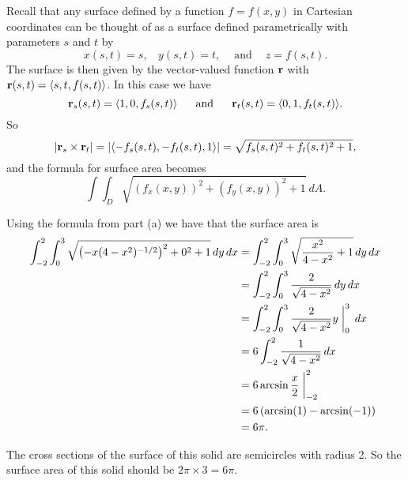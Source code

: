 \begin{activitySolution}
    \ba 
\item Recall that any surface defined by a function $f = f(x,y)$ in Cartesian coordinates can be thought of as a surface defined parametrically with parameters $s$ and $t$ by
\[x(s,t)=s, \ \ \ \ y(s,t) = t, \ \ \ \ \text{ and } \ \ \ \ z = f(s,t).\]
The surface is then given by the vector-valued function $\mathbf{r}$ with $\mathbf{r}(s,t) = \langle s, t, f(s,t) \rangle$. In this case we have
\[\mathbf{r}_s(s,t) = \langle 1,0,f_s(s,t)\rangle \ \ \ \ \text{ and } \ \ \ \ \mathbf{r}_t(s,t) = \langle 0,1,f_t(s,t)\rangle.\]
So
\[\lvert \mathbf{r}_s \times \mathbf{r}_t \rvert = \lvert \langle -f_s(s,t), -f_t(s,t), 1 \rangle \rvert = \sqrt{f_s(s,t)^2 + f_t(s,t)^2+1},\]
and the formula for surface area becomes
\[\int \int_D \sqrt{\left(f_x(x,y)\right)^2 + \left(f_y(x,y)\right)^2 + 1} \ dA.\]


    \item Using the formula from part (a) we have that the surface area is
\begin{align*}
\int_{-2}^2 \int_0^3 \sqrt{\left(-x(4-x^2)^{-1/2}\right)^2 + 0^2 + 1} \, dy \, dx &= \int_{-2}^2 \int_0^3 \sqrt{\frac{x^2}{4-x^2}+1} \, dy \, dx \\
    &= \int_{-2}^2 \int_0^3 \frac{2}{\sqrt{4-x^2}} \, dy \, dx \\
    &= \int_{-2}^2 \int_0^3  \frac{2}{\sqrt{4-x^2}}y\biggm|_0^3 \, dx \\
    &= 6\int_{-2}^2 \frac{1}{\sqrt{4-x^2}} \, dx \\
    &= 6 \arcsin{\frac{x}{2}}\biggm|_{-2}^2  \\
    &= 6\left(\arcsin(1)-\arcsin(-1)\right) \\
    &= 6\pi.
\end{align*}

\item The cross sections of the surface of this solid are semicircles with radius 2. So the surface area of this solid should be $2\pi \times 3 = 6\pi$.


\ea

\end{activitySolution}

\aftera
